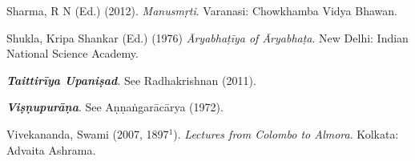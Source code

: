 \begin{thebibliography}{99}
Sharma, R N (Ed.) (2012).  {\sl Manusmṛti}. Varanasi: Chowkhamba Vidya Bhawan.

Shukla, Kripa Shankar (Ed.) (1976) {\sl Āryabhaṭīya of Āryabhaṭa}. New Delhi: Indian National Science Academy.

{{\sl\bfseries Taittirīya Upaniṣad}}. See Radhakrishnan (2011).

{{\sl\bfseries Viṣṇupurāṇa}}. See Aṇṇaṅgarācārya (1972).

Vivekananda, Swami (2007, 1897$^1$). {\sl Lectures from Colombo to Almora}. Kolkata: Advaita Ashrama.
\end{thebibliography}


\theendnotes
\label{chapter\thechapter:end}

